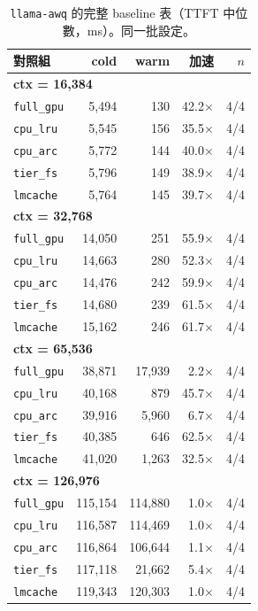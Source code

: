 \documentclass[11pt]{article}
\begin{document}
\begin{table}[htbp]\centering\small
\caption{\texttt{llama-awq} 的完整 baseline 表（TTFT 中位數，ms）。同一批設定。}
\begin{tabular}{lrrrr}
\toprule
對照組 & cold & warm & 加速 & $n$ \\
\midrule
\multicolumn{5}{l}{\textbf{ctx = 16,384}} \\
\quad \texttt{full\_gpu} & 5,494 & 130 & 42.2$\times$ & 4/4 \\
\quad \texttt{cpu\_lru} & 5,545 & 156 & 35.5$\times$ & 4/4 \\
\quad \texttt{cpu\_arc} & 5,772 & 144 & 40.0$\times$ & 4/4 \\
\quad \texttt{tier\_fs} & 5,796 & 149 & 38.9$\times$ & 4/4 \\
\quad \texttt{lmcache} & 5,764 & 145 & 39.7$\times$ & 4/4 \\
\multicolumn{5}{l}{\textbf{ctx = 32,768}} \\
\quad \texttt{full\_gpu} & 14,050 & 251 & 55.9$\times$ & 4/4 \\
\quad \texttt{cpu\_lru} & 14,663 & 280 & 52.3$\times$ & 4/4 \\
\quad \texttt{cpu\_arc} & 14,476 & 242 & 59.9$\times$ & 4/4 \\
\quad \texttt{tier\_fs} & 14,680 & 239 & 61.5$\times$ & 4/4 \\
\quad \texttt{lmcache} & 15,162 & 246 & 61.7$\times$ & 4/4 \\
\multicolumn{5}{l}{\textbf{ctx = 65,536}} \\
\quad \texttt{full\_gpu} & 38,871 & 17,939 & 2.2$\times$ & 4/4 \\
\quad \texttt{cpu\_lru} & 40,168 & 879 & 45.7$\times$ & 4/4 \\
\quad \texttt{cpu\_arc} & 39,916 & 5,960 & 6.7$\times$ & 4/4 \\
\quad \texttt{tier\_fs} & 40,385 & 646 & 62.5$\times$ & 4/4 \\
\quad \texttt{lmcache} & 41,020 & 1,263 & 32.5$\times$ & 4/4 \\
\multicolumn{5}{l}{\textbf{ctx = 126,976}} \\
\quad \texttt{full\_gpu} & 115,154 & 114,880 & 1.0$\times$ & 4/4 \\
\quad \texttt{cpu\_lru} & 116,587 & 114,469 & 1.0$\times$ & 4/4 \\
\quad \texttt{cpu\_arc} & 116,864 & 106,644 & 1.1$\times$ & 4/4 \\
\quad \texttt{tier\_fs} & 117,118 & 21,662 & 5.4$\times$ & 4/4 \\
\quad \texttt{lmcache} & 119,343 & 120,303 & 1.0$\times$ & 4/4 \\
\bottomrule
\end{tabular}
\end{table}
\end{document}
